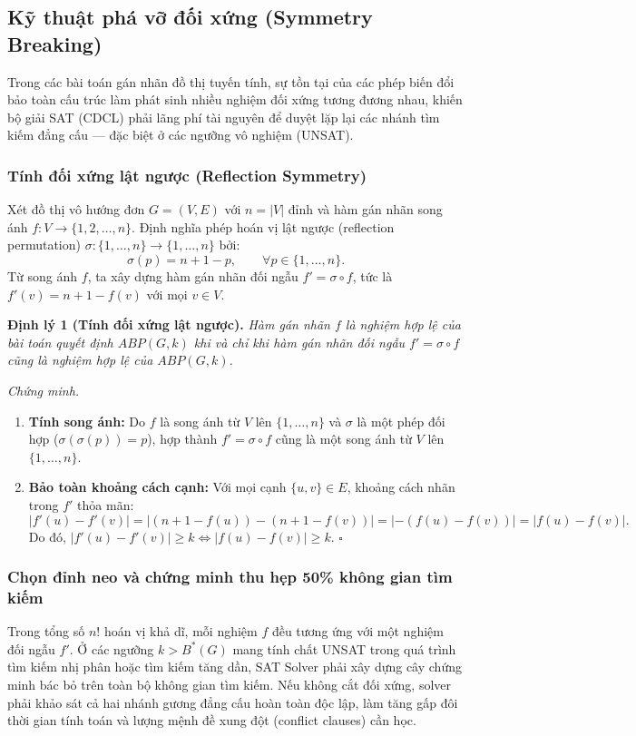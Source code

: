 \documentclass[a4paper,fleqn]{cas-sc}
\begin{document}
\subsection{Kỹ thuật phá vỡ đối xứng (Symmetry Breaking)}

Trong các bài toán gán nhãn đồ thị tuyến tính, sự tồn tại của các phép biến đổi bảo toàn cấu trúc làm phát sinh nhiều nghiệm đối xứng tương đương nhau, khiến bộ giải SAT (CDCL) phải lãng phí tài nguyên để duyệt lặp lại các nhánh tìm kiếm đẳng cấu --- đặc biệt ở các ngưỡng vô nghiệm (UNSAT).

\subsubsection{Tính đối xứng lật ngược (Reflection Symmetry)}
Xét đồ thị vô hướng đơn $G = (V, E)$ với $n = |V|$ đỉnh và hàm gán nhãn song ánh $f: V \to \{1, 2, \dots, n\}$. Định nghĩa phép hoán vị lật ngược (reflection permutation) $\sigma: \{1, \dots, n\} \to \{1, \dots, n\}$ bởi:
\begin{equation}
    \sigma(p) = n + 1 - p, \qquad \forall p \in \{1, \dots, n\}.
\end{equation}
Từ song ánh $f$, ta xây dựng hàm gán nhãn đối ngẫu $f' = \sigma \circ f$, tức là $f'(v) = n + 1 - f(v)$ với mọi $v \in V$.

\medskip
\noindent\textbf{Định lý 1 (Tính đối xứng lật ngược).}
\textit{Hàm gán nhãn $f$ là nghiệm hợp lệ của bài toán quyết định $ABP(G, k)$ khi và chỉ khi hàm gán nhãn đối ngẫu $f' = \sigma \circ f$ cũng là nghiệm hợp lệ của $ABP(G, k)$.}

\noindent\textit{Chứng minh.}
\begin{enumerate}
    \item \textbf{Tính song ánh:} Do $f$ là song ánh từ $V$ lên $\{1, \dots, n\}$ và $\sigma$ là một phép đối hợp ($\sigma(\sigma(p)) = p$), hợp thành $f' = \sigma \circ f$ cũng là một song ánh từ $V$ lên $\{1, \dots, n\}$.
    \item \textbf{Bảo toàn khoảng cách cạnh:} Với mọi cạnh $\{u, v\} \in E$, khoảng cách nhãn trong $f'$ thỏa mãn:
    \begin{equation}
        |f'(u) - f'(v)| = |(n + 1 - f(u)) - (n + 1 - f(v))| = |-(f(u) - f(v))| = |f(u) - f(v)|.
    \end{equation}
    Do đó, $|f'(u) - f'(v)| \ge k \iff |f(u) - f(v)| \ge k$. \hfill $\square$
\end{enumerate}

\subsubsection{Chọn đỉnh neo và chứng minh thu hẹp 50\% không gian tìm kiếm}
Trong tổng số $n!$ hoán vị khả dĩ, mỗi nghiệm $f$ đều tương ứng với một nghiệm đối ngẫu $f'$. Ở các ngưỡng $k > B^*(G)$ mang tính chất UNSAT trong quá trình tìm kiếm nhị phân hoặc tìm kiếm tăng dần, SAT Solver phải xây dựng cây chứng minh bác bỏ trên toàn bộ không gian tìm kiếm. Nếu không cắt đối xứng, solver phải khảo sát cả hai nhánh gương đẳng cấu hoàn toàn độc lập, làm tăng gấp đôi thời gian tính toán và lượng mệnh đề xung đột (conflict clauses) cần học.
\end{document}

